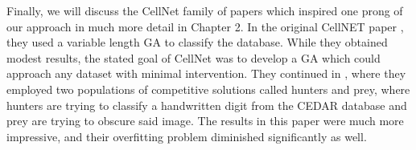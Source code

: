 Finally, we will discuss the CellNet family of papers which inspired one prong of our approach in much more detail in Chapter 2.  In the original CellNET paper \citep{kharma_project_2004} , they used a variable length GA to classify the \cite{cedar_cedar_2002} database.  While they obtained modest results, the stated goal of CellNet was to develop a GA which could approach any dataset with minimal intervention.  They continued in \cite{kowaliw_cellnet_2004}, where they employed two populations of competitive solutions called hunters and prey, where hunters are trying to classify a handwritten digit from the CEDAR database and prey are trying to obscure said image.  The results in this paper were much more impressive, and their overfitting problem diminished significantly as well.